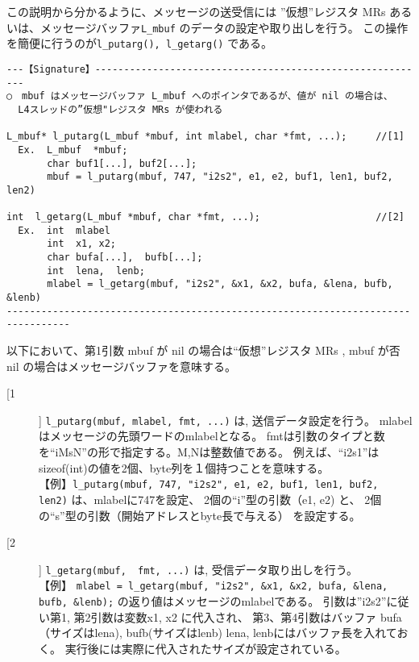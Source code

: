 この説明から分かるように、メッセージの送受信には
''仮想''レジスタ MRs あるいは、メッセージバッファ\verb|L_mbuf|
のデータの設定や取り出しを行う。
この操作を簡便に行うのが\verb|l_putarg(), l_getarg()| である。


\begin{verbatim}
---【Signature】----------------------------------------------------------
○　mbuf はメッセージバッファ L_mbuf へのポインタであるが、値が nil の場合は、
  L4スレッドの”仮想"レジスタ MRs が使われる

L_mbuf* l_putarg(L_mbuf *mbuf, int mlabel, char *fmt, ...);     //[1]
  Ex.  L_mbuf  *mbuf;
       char buf1[...], buf2[...];
       mbuf = l_putarg(mbuf, 747, "i2s2", e1, e2, buf1, len1, buf2, len2)

int  l_getarg(L_mbuf *mbuf, char *fmt, ...);                    //[2]
  Ex.  int  mlabel
       int  x1, x2;
       char bufa[...],  bufb[...];
       int  lena,  lenb;
       mlabel = l_getarg(mbuf, "i2s2", &x1, &x2, bufa, &lena, bufb, &lenb)
---------------------------------------------------------------------------------
\end{verbatim}


以下において、第1引数 mbuf が nil の場合は``仮想''レジスタ MRs ,
mbuf が否nil の場合はメッセージバッファを意味する。

\begin{description}
\item[[1]]
\verb|l_putarg(mbuf, mlabel, fmt, ...)| は, 送信データ設定を行う。
mlabelはメッセージの先頭ワードのmlabelとなる。
fmtは引数のタイプと数を``iMsN''の形で指定する。M,Nは整数値である。
例えば、``i2s1''はsizeof(int)の値を2個、byte列を１個持つことを意味する。\\

【例】\verb|l_putarg(mbuf, 747, "i2s2", e1, e2, buf1, len1, buf2, len2)|
  は、mlabelに747を設定、
  2個の``i''型の引数（e1, e2) と、
  2個の``s''型の引数（開始アドレスとbyte長で与える）
  を設定する。


\item[[2]]
  \verb|l_getarg(mbuf,  fmt, ...)| は, 受信データ取り出しを行う。  \\

【例】 \verb|mlabel = l_getarg(mbuf, "i2s2", &x1, &x2, bufa, &lena, bufb, &lenb);|
  の返り値はメッセージのmlabelである。
  引数は''i2s2''に従い第1, 第2引数は変数x1, x2 に代入され、
  第3、第4引数はバッファ bufa （サイズはlena),  bufb(サイズはlenb)
  lena, lenbにはバッファ長を入れておく。
  実行後には実際に代入されたサイズが設定されている。

\end{description}



